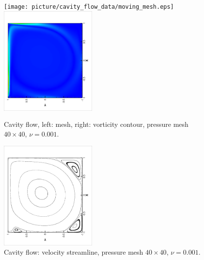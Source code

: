 \documentclass{eajam}
\begin{document}
       
       \begin{figure}[!htbp]
         \begin{center}
             \texttt{[image: picture/cavity\_flow\_data/moving\_mesh.eps]}
             \includegraphics[width = 0.43\textwidth, angle = -90]{picture/cavity_flow_data/vortex.eps}
        \end{center}
        \caption{\small Cavity flow, left: mesh, right: vorticity
          contour, pressure mesh $40 \times 40$, $\nu = 0.001$.}
        \label{fig::cavity_flow_mesh}
       \end{figure}

       \begin{figure}[!htbp]
         \begin{center}
             \includegraphics[width = 0.43\textwidth, angle = -90]{picture/cavity_flow_data/streamline.eps}
        \end{center}
        \caption{\small Cavity flow: velocity streamline, pressure
          mesh $40 \times 40$, $\nu = 0.001$.}
        \label{fig::cavity_flow_streamline}
       \end{figure}
\end{document}
